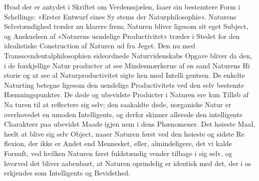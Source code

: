 \documentclass[12pt,a4paper]{book}
\begin{document}
Hvad der er antydet i Skriftet om Verdenssjælen, faaer
sin bestemtere Form i Schellings: «Erster Entwurf eines Sy\-%
stems der Naturphilosophie». Naturens Selvstændighed træder
nu klarere frem; Naturen bliver ligesom sit eget Subject, og
Anskuelsen af «Naturens uendelige Productivitet» træder i
Stedet for den idealistiske Construction af Naturen ud fra
Jeget. Den nu med Transscendentalphilosophien sideordnede
Naturvidenskabs Opgave bliver da den, i de forskjellige Natur\-%
producter at see Mindesmærkerne af en sand Naturens Hi\-%
storie og at see al Naturproductivitet sigte hen mod Intelli\-%
gentsen. De enkelte Naturting betegne ligesom den uendelige
Productivitets ved den selv bestemte Hæmningspunkter. De
døde og ubevidste Producter i Naturen ere kun Tilløb af Na\-%
turen til at reflectere sig selv; den saakaldte døde, uorganiske
Natur er overhovedet en umoden Intelligents, og derfor skinner
allerede den intelligente Charakteer paa ubevidst Maade igjen\-%
nem i dens Phænomener. Det høieste Maal, heelt at blive sig
selv Object, naaer Naturen først ved den høieste og sidste Re\-%
flexion, der ikke er Andet end Mennesket, eller, almindeligere,
det vi kalde Fornuft, ved hvilken Naturen først fuldstændig
vender tilbage i sig selv, og hvorved det bliver aabenbart, at
Naturen oprindelig er identisk med det, der i os erkjendes
som Intelligents og Bevidsthed.
\end{document}

